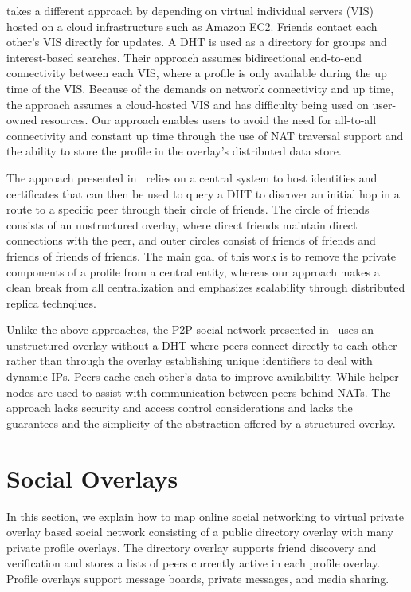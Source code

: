 \documentclass[conference]{IEEEtran}
\begin{document}
\cite{vis-a-vis} takes a different approach by depending on virtual individual
servers (VIS) hosted on a cloud infrastructure such as Amazon EC2. Friends
contact each other's VIS directly for updates.  A DHT is used as a directory for
groups and interest-based searches. Their approach assumes bidirectional
end-to-end connectivity between each VIS, where a profile is only available
during the up time of the VIS.  Because of the demands on network connectivity
and up time, the approach assumes a cloud-hosted VIS and has difficulty being
used on user-owned resources.  Our approach enables users to avoid the need for
all-to-all connectivity and constant up time through the use of NAT traversal
support and the ability to store the profile in the overlay's distributed data
store.

The approach presented in~\cite{matryoshka} relies on a central system to host
identities and certificates that can then be used to query a DHT to discover an
initial hop in a route to a specific peer through their circle of friends.  The
circle of friends consists of an unstructured overlay, where direct friends
maintain direct connections with the peer, and outer circles consist of friends
of friends and friends of friends of friends.  The main goal of this work is
to remove the private components of a profile from a central entity, whereas
our approach makes a clean break from all centralization and emphasizes
scalability through distributed replica technqiues.

Unlike the above approaches, the P2P social network presented in~\cite{tribler-osn}
uses an unstructured overlay without a DHT where peers connect directly to
each other rather than through the overlay establishing unique identifiers to
deal with dynamic IPs.  Peers cache each other's data to improve availability.
While helper nodes are used to assist with communication between peers behind
NATs.  The approach lacks security and access control considerations and lacks the
guarantees and the simplicity of the abstraction offered by a structured overlay.

\section{Social Overlays}
\label{social_overlays}
In this section, we explain how to map online social networking to virtual
private overlay based social network consisting of a public directory overlay
with many private profile overlays.  The directory overlay supports friend
discovery and verification and stores a lists of peers currently active in each
profile overlay.  Profile overlays support message boards, private messages, and
media sharing.
\end{document}
